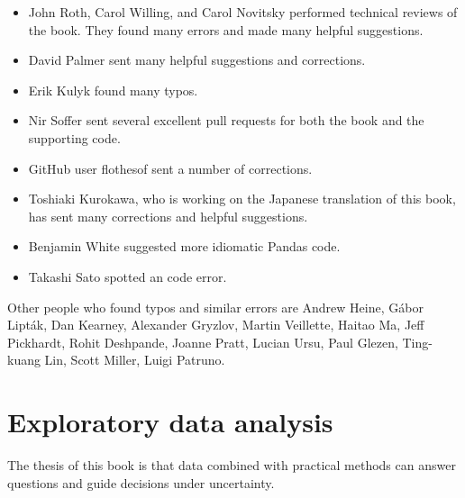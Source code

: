 \documentclass[12pt]{book}
\theoremstyle{exercise}
\newcommand{\clearemptydoublepage}{\cleardoublepage}
\begin{document}
\begin{itemize}
\item John Roth, Carol Willing, and Carol Novitsky performed technical
reviews of the book.  They found many errors and made many
helpful suggestions.

\item David Palmer sent many helpful suggestions and corrections.

\item Erik Kulyk found many typos.

\item Nir Soffer sent several excellent pull requests for both the
  book and the supporting code.

\item GitHub user flothesof sent a number of corrections.

\item Toshiaki Kurokawa, who is working on the Japanese translation of
this book, has sent many corrections and helpful suggestions.

\item Benjamin White suggested more idiomatic Pandas code.

\item Takashi Sato spotted an code error.


\end{itemize}

Other people who found typos and similar errors are Andrew Heine,
G\'{a}bor Lipt\'{a}k,
Dan Kearney,
Alexander Gryzlov, 
Martin Veillette, 
Haitao Ma, 
Jeff Pickhardt,
Rohit Deshpande,
Joanne Pratt,
Lucian Ursu,
Paul Glezen,
Ting-kuang Lin,
Scott Miller,
Luigi Patruno.



\normalsize

\clearemptydoublepage

\begin{latexonly}

\tableofcontents

\clearemptydoublepage

\end{latexonly}

\mainmatter


\chapter{Exploratory data analysis}%
\label{intro}

The thesis of this book is that data combined with practical
methods can answer questions and guide decisions under uncertainty.
\end{document}

